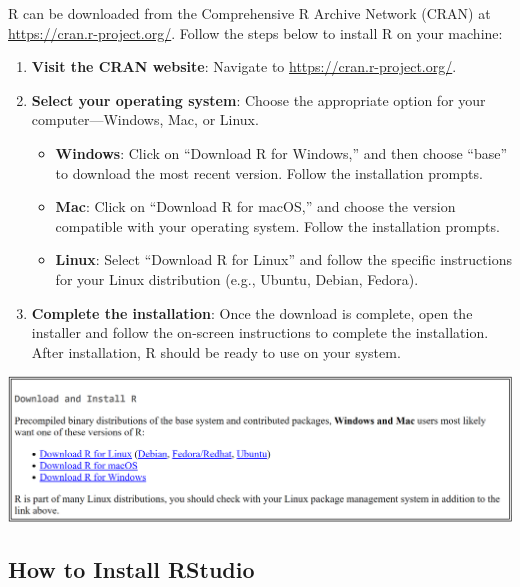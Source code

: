 \documentclass[
]{book}
\providecommand{\tightlist}{%
  \setlength{\itemsep}{0pt}\setlength{\parskip}{0pt}}
\begin{document}
R can be downloaded from the Comprehensive R Archive Network (CRAN) at \url{https://cran.r-project.org/}. Follow the steps below to install R on your machine:

\begin{enumerate}
\def\labelenumi{\arabic{enumi}.}
\tightlist
\item
  \textbf{Visit the CRAN website}: Navigate to \url{https://cran.r-project.org/}.
\item
  \textbf{Select your operating system}: Choose the appropriate option for your computer---Windows, Mac, or Linux.

  \begin{itemize}
  \tightlist
  \item
    \textbf{Windows}: Click on ``Download R for Windows,'' and then choose ``base'' to download the most recent version. Follow the installation prompts.
  \item
    \textbf{Mac}: Click on ``Download R for macOS,'' and choose the version compatible with your operating system. Follow the installation prompts.
  \item
    \textbf{Linux}: Select ``Download R for Linux'' and follow the specific instructions for your Linux distribution (e.g., Ubuntu, Debian, Fedora).
  \end{itemize}
\item
  \textbf{Complete the installation}: Once the download is complete, open the installer and follow the on-screen instructions to complete the installation. After installation, R should be ready to use on your system.
\end{enumerate}

\href{https://cran.r-project.org/}{\includegraphics[width=1\linewidth,height=\textheight,keepaspectratio]{images/install-r.png}}

\subsection*{How to Install RStudio}\label{how-to-install-rstudio}
\end{document}
